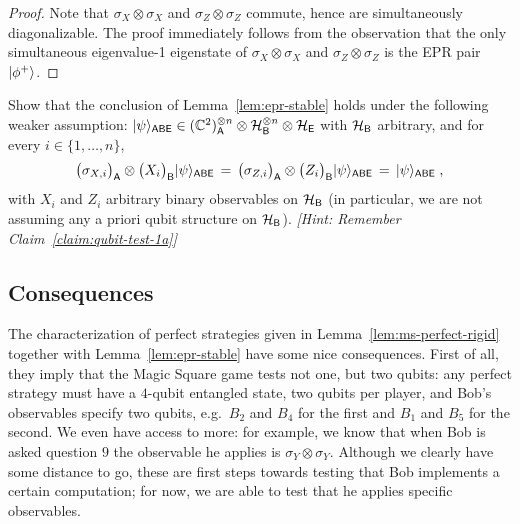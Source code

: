 \begin{proof}
Note that $\sigma_X\otimes \sigma_X$ and $\sigma_Z\otimes \sigma_Z$ commute, hence are simultaneously diagonalizable. 
The proof immediately follows from the observation that the only simultaneous eigenvalue-1 eigenstate of $\sigma_X\otimes \sigma_X$ and $\sigma_Z\otimes \sigma_Z$ is the EPR pair $|\phi^+\rangle$. 
\end{proof}

\begin{exercise}
Show that the conclusion of Lemma~\ref{lem:epr-stable} holds under the following weaker assumption: $|\psi\rangle_{{\textsf{ABE}}} \in (\mathbb{C}^2)_{\textsf{A}}^{\otimes n} \otimes \mathcal{H}_{\textsf{B}}^{\otimes n} \otimes \mathcal{H}_{\textsf{E}}$ with $\mathcal{H}_{\textsf{B}}$ arbitrary, and for every $i\in \{1,\ldots, n\}$,
\[\big(\sigma_{X,i}\big)_{\textsf{A}} \otimes \big(X_i\big)_{\textsf{B}} |\psi\rangle_{{\textsf{ABE}}} \,=\, \big(\sigma_{Z,i}\big)_{\textsf{A}} \otimes \big(Z_i\big)_{\textsf{B}} |\psi\rangle_{{\textsf{ABE}}} \,=\,|\psi\rangle_{\textsf{ABE}}\;,\]
with $X_i$ and $Z_i$ arbitrary binary observables on $\mathcal{H}_{\textsf{B}}$ (in particular, we are not assuming any a priori qubit structure on $\mathcal{H}_{\textsf{B}}$). \emph{[Hint: Remember Claim~\ref{claim:qubit-test-1a}]}
\end{exercise}


\subsection{Consequences} 
\label{sec:spatial-consequences}

The characterization of perfect strategies given in Lemma~\ref{lem:ms-perfect-rigid} together with Lemma~\ref{lem:epr-stable} have some nice consequences. First of all, they imply that the Magic Square game tests not one, but two qubits: any perfect strategy must have a $4$-qubit entangled state, two qubits per player, and Bob's observables specify two qubits, e.g.\ $B_2$ and $B_4$ for the first and $B_1$ and $B_5$ for the second. We even have access to more: for example, we know that when Bob is asked question $9$ the observable he applies is $\sigma_Y \otimes \sigma_Y$. Although we clearly have some distance to go, these are first steps towards testing that Bob implements a certain computation; for now, we are able to test that he applies specific observables. 

